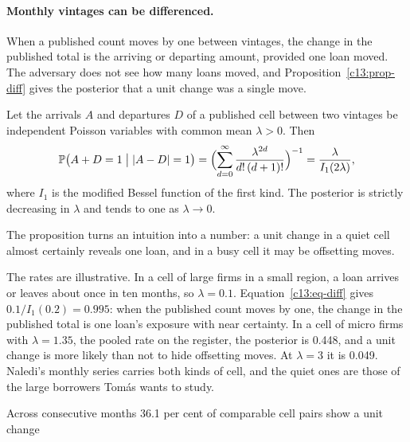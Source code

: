 \paragraph{Monthly vintages can be differenced.} When a published count moves by
one between vintages, the change in the published total is the arriving or departing
amount, provided one loan moved. The adversary does not see how many loans moved,
and Proposition~\ref{c13:prop-diff} gives the posterior that a unit change was a
single move.

\begin{proposition}\label{c13:prop-diff}
Let the arrivals $A$ and departures $D$ of a published cell between two vintages be
independent Poisson variables with common mean $\lambda > 0$. Then
\begin{equation}\label{c13:eq-diff}
\mathbb{P}\bigl(A + D = 1 \bigm| |A - D| = 1\bigr)
= \Bigl(\sum_{d=0}^{\infty} \frac{\lambda^{2d}}{d!\,(d+1)!}\Bigr)^{-1}
= \frac{\lambda}{I_1(2\lambda)},
\end{equation}
where $I_1$ is the modified Bessel function of the first kind. The posterior is
strictly decreasing in $\lambda$ and tends to one as $\lambda \to 0$.
\end{proposition}

The proposition turns an intuition into a number: a unit change in a quiet cell
almost certainly reveals one loan, and in a busy cell it may be offsetting moves.
\begin{example}\label{c13:ex-cells}
The rates are illustrative. In a cell of large firms in a small region, a loan arrives
or leaves about once in ten months, so $\lambda = 0.1$. Equation~\eqref{c13:eq-diff}
gives $0.1/I_1(0.2) = 0.995$: when the published count moves by one, the change in the
published total is one loan's exposure with near certainty. In a cell of micro firms with
$\lambda = 1.35$, the pooled rate on the register, the posterior is 0.448, and a unit
change is more likely than not to hide offsetting moves. At $\lambda = 3$ it is 0.049.
Naledi's monthly series carries both kinds of cell, and the quiet ones are those of the
large borrowers Tom\'as wants to study.
\end{example}

Across consecutive months 36.1 per cent of comparable cell pairs show a unit change

